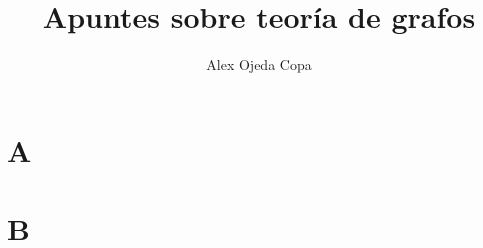 \documentclass{article}
\title{Apuntes sobre teoría de grafos}
\author{Alex Ojeda Copa}
\begin{document}
\maketitle

\section{A}

\section{B}
\end{document}
